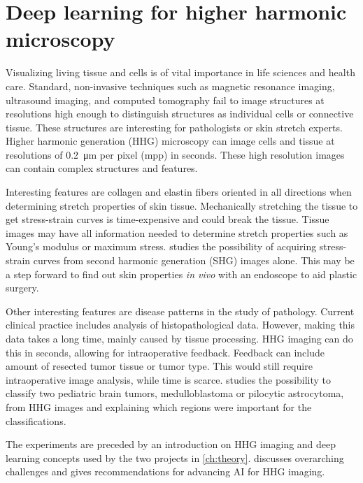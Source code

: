 \section{Deep learning for higher harmonic microscopy}
Visualizing living tissue and cells is of vital importance in life sciences and health care.
Standard, non-invasive techniques such as magnetic resonance imaging, ultrasound imaging, and computed tomography fail to image structures at resolutions high enough to distinguish structures as individual cells or connective tissue.
These structures are interesting for pathologists or skin stretch experts.
Higher harmonic generation (HHG) microscopy can image cells and tissue at resolutions of \qty{0.2}{\micro\meter} per pixel (mpp) in seconds.
These high resolution images %
can contain complex structures and features.

Interesting features are collagen and elastin fibers oriented in all directions when determining stretch properties of skin tissue.
Mechanically stretching the tissue to get stress-strain curves is time-expensive and could break the tissue.
Tissue images may have all information needed to determine stretch properties such as Young's modulus or maximum stress.
 studies the possibility of acquiring stress-strain curves from second harmonic generation (SHG) images alone.
This may be a step forward to find out skin properties \emph{in vivo} with an endoscope to aid plastic surgery.

Other interesting features are disease patterns in the study of pathology.
Current clinical practice includes analysis of histopathological data.
However, making this data takes a long time, mainly caused by tissue processing.
HHG imaging can do this in seconds, allowing for intraoperative feedback.
Feedback can \eg include amount of resected tumor tissue or tumor type.
This would still require intraoperative image analysis, while time is scarce.
 studies the possibility to classify two pediatric brain tumors, medulloblastoma or pilocytic astrocytoma, from HHG images and explaining which regions were important for the classifications.

The experiments are preceded by an introduction on HHG imaging and deep learning concepts used by the two projects in \cref{ch:theory}.
 discusses overarching challenges and gives recommendations for advancing AI for HHG imaging.

